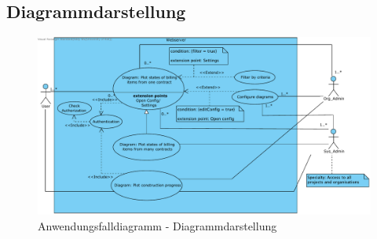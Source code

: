 \clearpage

\subsection{Diagrammdarstellung}

\begin{figure}[h]
	\centering
	\includegraphics[width=\linewidth]{img/diagrams/Diagram_Display_Management_Web.pdf}
	\caption{Anwendungsfalldiagramm - Diagrammdarstellung}
	\label{fig:anwendungsfalldiagramm-dia-verwaltung}
\end{figure}

\newpage

